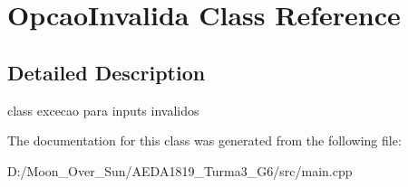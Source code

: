 \hypertarget{class_opcao_invalida}{}\section{Opcao\+Invalida Class Reference}
\label{class_opcao_invalida}


\subsection{Detailed Description}
class excecao para inputs invalidos 

The documentation for this class was generated from the following file\+:\begin{DoxyCompactItemize}
\item 
D\+:/\+Moon\+\_\+\+Over\+\_\+\+Sun/\+A\+E\+D\+A1819\+\_\+\+Turma3\+\_\+\+G6/src/main.\+cpp\end{DoxyCompactItemize}
